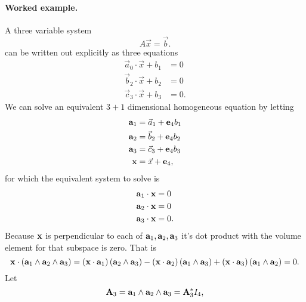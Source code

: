 \paragraph{Worked example.}

A three variable system
\begin{equation}\label{eqn:hyperwedge:160}
A \vec{x} = \vec{b}.
\end{equation}
can be written out explicitly as three equations
\begin{equation}\label{eqn:hyperwedge:120}
\begin{aligned}
\vec{a}_0 \cdot \vec{x} + b_1 &= 0 \\
\vec{b}_2 \cdot \vec{x} + b_2 &= 0 \\
\vec{c}_3 \cdot \vec{x} + b_3 &= 0.
\end{aligned}
\end{equation}
We can solve an equivalent \( 3 + 1 \) dimensional homogeneous equation by letting
\begin{equation}\label{eqn:hyperwedge:180}
\begin{aligned}
\mathbf{a}_1 &= \vec{a}_1 + \mathbf{e}_4 b_1 \\
\mathbf{a}_2 &= \vec{b}_2 + \mathbf{e}_4 b_2 \\
\mathbf{a}_3 &= \vec{c}_3 + \mathbf{e}_4 b_3 \\
\mathbf{x} &= \vec{x} + \mathbf{e}_4,
\end{aligned}
\end{equation}
for which the equivalent system to solve is
\begin{equation}\label{eqn:hyperwedge:200}
\begin{aligned}
\mathbf{a}_1 \cdot \mathbf{x} &= 0 \\
\mathbf{a}_2 \cdot \mathbf{x} &= 0 \\
\mathbf{a}_3 \cdot \mathbf{x} &= 0.
\end{aligned}
\end{equation}
Because \( \mathbf{x} \) is perpendicular to each of \( \mathbf{a}_1, \mathbf{a}_2, \mathbf{a}_3 \) it's dot product with the volume element for that subspace is zero.  That is
\begin{equation}\label{eqn:hyperwedge:220}
\mathbf{x} \cdot \left( \mathbf{a}_1 \wedge \mathbf{a}_2 \wedge \mathbf{a}_3 \right)
=
\left(\mathbf{x} \cdot \mathbf{a}_1\right) \left( \mathbf{a}_2 \wedge \mathbf{a}_3 \right)
-\left(\mathbf{x} \cdot \mathbf{a}_2\right) \left( \mathbf{a}_1 \wedge \mathbf{a}_3 \right)
+\left(\mathbf{x} \cdot \mathbf{a}_3\right) \left( \mathbf{a}_1 \wedge \mathbf{a}_2 \right)
= 0.
\end{equation}
Let
\begin{equation}\label{eqn:hyperwedge:240}
\mathbf{A}_3 = \mathbf{a}_1 \wedge \mathbf{a}_2 \wedge \mathbf{a}_3 = \mathbf{A}_3^{*} I_4,
\end{equation}
